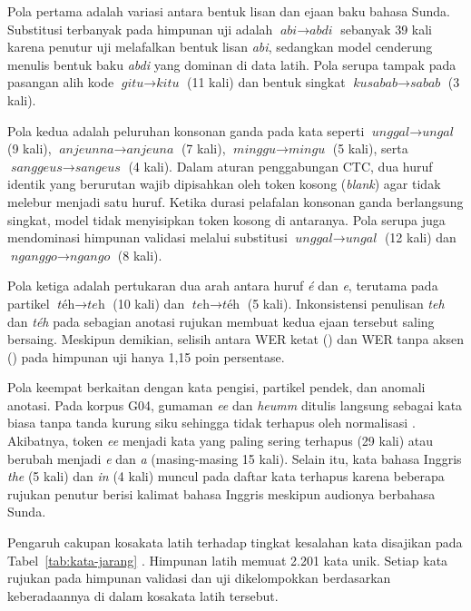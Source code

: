 Pola pertama adalah variasi antara bentuk lisan dan ejaan baku bahasa Sunda. Substitusi terbanyak pada himpunan uji adalah \(\textit{abi} \rightarrow \textit{abdi}\) sebanyak 39 kali karena penutur uji melafalkan bentuk lisan \textit{abi}, sedangkan model cenderung menulis bentuk baku \textit{abdi} yang dominan di data latih. Pola serupa tampak pada pasangan alih kode \(\textit{gitu} \rightarrow \textit{kitu}\) (11 kali) dan bentuk singkat \(\textit{kusabab} \rightarrow \textit{sabab}\) (3 kali).

Pola kedua adalah peluruhan konsonan ganda pada kata seperti \(\textit{unggal} \rightarrow \textit{ungal}\) (9 kali), \(\textit{anjeunna} \rightarrow \textit{anjeuna}\) (7 kali), \(\textit{minggu} \rightarrow \textit{mingu}\) (5 kali), serta \(\textit{sanggeus} \rightarrow \textit{sangeus}\) (4 kali). Dalam aturan penggabungan CTC, dua huruf identik yang berurutan wajib dipisahkan oleh token kosong (\textit{blank}) agar tidak melebur menjadi satu huruf. Ketika durasi pelafalan konsonan ganda berlangsung singkat, model tidak menyisipkan token kosong di antaranya. Pola serupa juga mendominasi himpunan validasi melalui substitusi \(\textit{unggal} \rightarrow \textit{ungal}\) (12 kali) dan \(\textit{nganggo} \rightarrow \textit{ngango}\) (8 kali).

Pola ketiga adalah pertukaran dua arah antara huruf \textit{é} dan \textit{e}, terutama pada partikel \(\textit{téh} \rightarrow \textit{teh}\) (10 kali) dan \(\textit{teh} \rightarrow \textit{téh}\) (5 kali). Inkonsistensi penulisan \textit{teh} dan \textit{téh} pada sebagian anotasi rujukan membuat kedua ejaan tersebut saling bersaing. Meskipun demikian, selisih antara WER ketat () dan WER tanpa aksen () pada himpunan uji hanya 1,15 poin persentase.

Pola keempat berkaitan dengan kata pengisi, partikel pendek, dan anomali anotasi. Pada korpus G04, gumaman \textit{ee} dan \textit{heumm} ditulis langsung sebagai kata biasa tanpa tanda kurung siku sehingga tidak terhapus oleh normalisasi . Akibatnya, token \textit{ee} menjadi kata yang paling sering terhapus (29 kali) atau berubah menjadi \textit{e} dan \textit{a} (masing-masing 15 kali). Selain itu, kata bahasa Inggris \textit{the} (5 kali) dan \textit{in} (4 kali) muncul pada daftar kata terhapus karena beberapa rujukan penutur  berisi kalimat bahasa Inggris meskipun audionya berbahasa Sunda.

Pengaruh cakupan kosakata latih terhadap tingkat kesalahan kata disajikan pada Tabel~\ref{tab:kata-jarang} \cite{repoasr}. Himpunan latih memuat 2.201 kata unik. Setiap kata rujukan pada himpunan validasi dan uji dikelompokkan berdasarkan keberadaannya di dalam kosakata latih tersebut.

